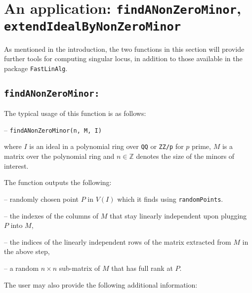 \documentclass[11pt]{amsart}
\theoremstyle{definition}
\begin{document}




\section{An application:  {\tt findANonZeroMinor}, {\tt extendIdealByNonZeroMinor}}

As mentioned in the introduction, the two functions in this section will provide further tools for computing singular locus, in addition to those available in the package {\tt FastLinAlg}. 

\subsection{\tt findANonZeroMinor:}\label{findANonZeroMinor} The typical usage of this function is as follows: 

\vspace{0.5em}
-- {\tt findANonZeroMinor(n, M, I)} 
\vspace{0.5em}

\noindent where $I$ is an ideal
in a polynomial ring over {\tt QQ} or {\tt ZZ/p} for $p$ prime, $M$ is a matrix
over the polynomial ring and $n\in \mathbb{Z}$ denotes the size of the minors of interest.


The function outputs the following:

-- randomly chosen point $P$ in $V(I)$ which it finds using {\tt randomPoints}.

-- the indexes of the columns of $M$ that stay linearly independent upon plugging $P$ into $M$, 

-- the indices of the linearly independent rows of the matrix extracted from $M$ in the above step, 

-- a random $n\times n$ sub-matrix of $M$ that has full rank at $P$.

The user may also provide the following additional information: 
\end{document}

